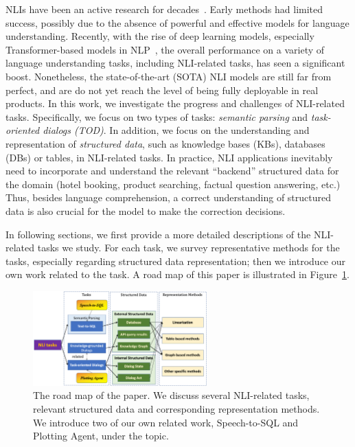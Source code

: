 \documentclass[11pt,dvipdfm]{article}
\begin{document}
NLIs have been an active research for decades~\cite{winograd1971procedures,karamcheti-etal-2020-learning}.
Early methods had limited success, possibly due to the absence of powerful and effective models for language understanding. Recently, with the rise of deep learning models, especially Transformer-based models in NLP~\cite{vaswaniTransformer}, the overall performance on a variety of language understanding tasks, including NLI-related tasks, has seen a significant boost. Nonetheless, the state-of-the-art (SOTA) NLI models are still far from perfect, and are do not yet reach the level of being fully deployable in real products. 
In this work, we investigate the progress and challenges of NLI-related tasks. Specifically,
we focus on two types of tasks: \textit{semantic parsing} and \textit{task-oriented dialogs (TOD)}. 
In addition, we focus on the understanding and representation of \textit{structured data}, such as knowledge bases (KBs), databases (DBs) or tables, in NLI-related tasks. In practice, NLI applications inevitably need to incorporate and understand the relevant ``backend'' structured data for the domain (hotel booking, product searching, factual question answering, etc.)
Thus, besides language comprehension, a correct understanding of structured data is also crucial for the model to make the correction decisions.

In following sections, we first provide a more detailed descriptions of the NLI-related tasks we study. For each task, we survey representative methods for the tasks, especially regarding structured data representation; then we introduce our own work related to the task. A road map of this paper is illustrated in Figure~\ref{fig:roadmap}.

\begin{figure}[h]
\centering
\includegraphics[width=0.6\textwidth]{figs/roadmap-v1.1.pdf}
\caption{The road map of the paper. We discuss several NLI-related tasks, relevant structured data and corresponding representation methods. We introduce two of our own related work, Speech-to-SQL and Plotting Agent, under the topic.}
\label{fig:roadmap}
\end{figure}
\end{document}
